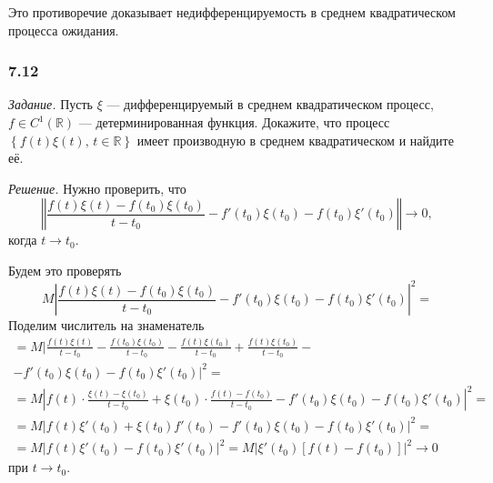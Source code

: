 Это противоречие доказывает недифференцируемость в среднем квадратическом процесса ожидания.

\subsubsection*{7.12}

\textit{Задание.}
Пусть $ \xi $ --- дифференцируемый в среднем квадратическом процесс,
$f \in C^1 \left( \mathbb{R} \right) $ --- детерминированная функция.
Докажите,
что процесс $ \left\{ f \left( t \right) \xi \left( t \right), \, t \in \mathbb{R} \right\} $
имеет производную в среднем квадратическом и найдите её.

\textit{Решение.}
Нужно проверить, что
$$ \left \Vert
    \frac{f \left( t \right) \xi \left( t \right) - f \left( t_0 \right) \xi \left( t_0 \right) }{t - t_0} -
    f' \left( t_0 \right) \xi \left( t_0 \right) - f \left( t_0 \right) \xi' \left( t_0 \right)
  \right \Vert \to
  0,$$
когда $t \to t_0$.

Будем это проверять
$$M \left|
    \frac{f \left( t \right) \xi \left( t \right) - f \left( t_0 \right) \xi \left( t_0 \right) }{t - t_0} -
    f' \left( t_0 \right) \xi \left( t_0 \right) - f \left( t_0 \right) \xi' \left( t_0 \right)
  \right|^2 =$$
Поделим числитель на знаменатель
\begin{gather*}
  = M|
    \frac{f \left( t \right) \xi \left( t \right) }{t - t_0} -
    \frac{f \left( t_0 \right) \xi \left( t_0 \right) }{t - t_0} -
    \frac{f \left( t \right) \xi \left( t_0 \right) }{t - t_0} +
    \frac{f \left( t \right) \xi \left( t_0 \right) }{t - t_0} - \\
    - f' \left( t_0 \right) \xi \left( t_0 \right) - f \left( t_0 \right) \xi' \left( t_0 \right)
  |^2 = \\
  = M \left|
    f \left( t \right) \cdot \frac{ \xi \left( t \right) - \xi \left( t_0 \right) }{t - t_0} +
    \xi \left( t_0 \right) \cdot \frac{f \left( t \right) - f \left( t_0 \right) }{t - t_0} -
    f' \left( t_0 \right) \xi \left( t_0 \right) - f \left( t_0 \right) \xi' \left( t_0 \right)
  \right|^2 = \\
  = M \left|
    f \left( t \right) \xi' \left( t_0 \right) + \xi \left( t_0 \right) f' \left( t_0 \right) -
    f' \left( t_0 \right) \xi \left( t_0 \right) - f \left( t_0 \right) \xi' \left( t_0 \right)
  \right|^2 = \\
  = M \left|
    f \left( t \right) \xi' \left( t_0 \right) - f \left( t_0 \right) \xi' \left( t_0 \right)
  \right|^2 =
  M \left|
    \xi' \left( t_0 \right) \left[ f \left( t \right) - f \left( t_0 \right) \right]
  \right|^2 \to
  0
\end{gather*}
при $t \to t_0$.

